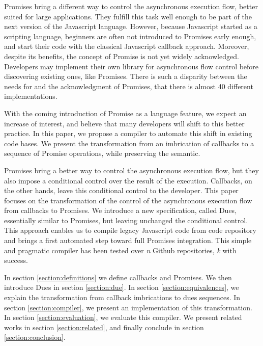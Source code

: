 Promises bring a different way to control the asynchronous execution flow, better suited for large applications.
They fulfill this task well enough to be part of the next version of the Javascript language.
However, because Javascript started as a scripting language, beginners are often not introduced to Promises early enough, and start their code with the classical Javascript callback approach.
Moreover, despite its benefits, the concept of Promise is not yet widely acknowledged.
Developers may implement their own library for asynchronous flow control before discovering existing ones, like Promises.
There is such a disparity between the needs for and the acknowledgment of Promises, that there is almost 40 different implementations.

With the coming introduction of Promise as a language feature, we expect an increase of interest, and believe that many developers will shift to this better practice.
In this paper, we propose a compiler to automate this shift in existing code bases.
We present the transformation from an imbrication of callbacks to a sequence of Promise operations, while preserving the semantic.

Promises bring a better way to control the asynchronous execution flow, but they also impose a conditional control over the result of the execution.
Callbacks, on the other hands, leave this conditional control to the developer.
This paper focuses on the transformation of the control of the asynchronous execution flow from callbacks to Promises.
We introduce a new specification, called Dues, essentially similar to Promises, but leaving unchanged the conditional control.
This approach enables us to compile legacy Javascript code from code repository and brings a first automated step toward full Promises integration.
This simple and pragmatic compiler has been tested over \textit{n} Github repositories, \textit{k} with success. 

In section \ref{section:definitions} we define callbacks and Promises.
We then introduce Dues in section \ref{section:due}.
In section \ref{section:equivalences}, we explain the transformation from callback imbrications to dues sequences.
In section \ref{section:compiler}, we present an implementation of this transformation.
In section \ref{section:evaluation}, we evaluate this compiler.
We present related works in section \ref{section:related}, and finally conclude in section \ref{section:conclusion}.